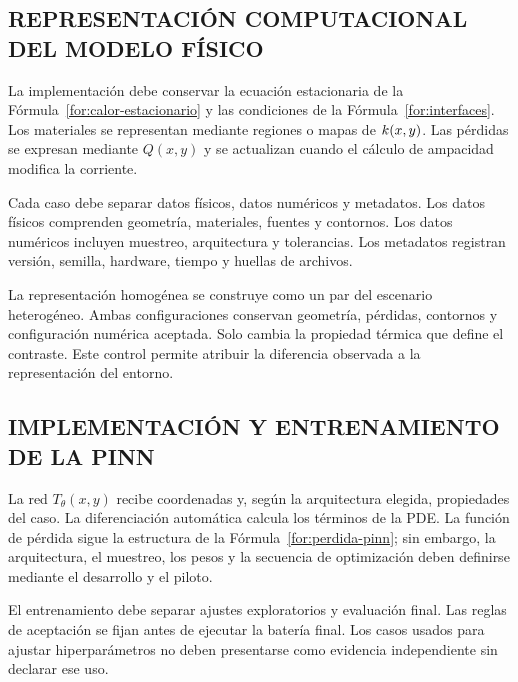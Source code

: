 
\subsection{REPRESENTACIÓN COMPUTACIONAL DEL MODELO FÍSICO}

La implementación debe conservar la ecuación estacionaria de la Fórmula~\ref{for:calor-estacionario} y las condiciones de la Fórmula~\ref{for:interfaces}. Los materiales se representan mediante regiones o mapas de $k(x,y)$. Las pérdidas se expresan mediante $Q(x,y)$ y se actualizan cuando el cálculo de ampacidad modifica la corriente.

Cada caso debe separar datos físicos, datos numéricos y metadatos. Los datos físicos comprenden geometría, materiales, fuentes y contornos. Los datos numéricos incluyen muestreo, arquitectura y tolerancias. Los metadatos registran versión, semilla, hardware, tiempo y huellas de archivos.

La representación homogénea se construye como un par del escenario heterogéneo. Ambas configuraciones conservan geometría, pérdidas, contornos y configuración numérica aceptada. Solo cambia la propiedad térmica que define el contraste. Este control permite atribuir la diferencia observada a la representación del entorno.


\subsection{IMPLEMENTACIÓN Y ENTRENAMIENTO DE LA PINN}

La red $T_\theta(x,y)$ recibe coordenadas y, según la arquitectura elegida, propiedades del caso. La diferenciación automática calcula los términos de la PDE. La función de pérdida sigue la estructura de la Fórmula~\ref{for:perdida-pinn}; sin embargo, la arquitectura, el muestreo, los pesos y la secuencia de optimización deben definirse mediante el desarrollo y el piloto.

El entrenamiento debe separar ajustes exploratorios y evaluación final. Las reglas de aceptación se fijan antes de ejecutar la batería final. Los casos usados para ajustar hiperparámetros no deben presentarse como evidencia independiente sin declarar ese uso.

